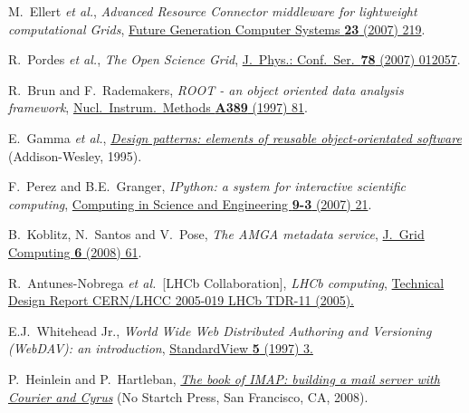 \documentclass{elsart}
\def\etal {\textit{et al.}}
\begin{document}
\begin{thebibliography}{00}
 M.~Ellert \etal,
\textit{Advanced Resource Connector middleware for lightweight
computational Grids},
\href{http://dx.doi.org/10.1016/j.future.2006.05.008}
{Future Generation Computer Systems \textbf{23} (2007) 219}.
  

 R.~Pordes \etal,
\textit{The Open Science Grid},
\href{http://dx.doi.org/10.1088/1742-6596/78/1/012057}
{J.~Phys.: Conf.\ Ser.\ \textbf{78} (2007) 012057}.

 R.~Brun and F.~Rademakers,
\textit{ROOT - an object oriented data analysis framework},
\href{http://dx.doi.org/10.1016/S0168-9002(97)00048-X}
{Nucl.\ Instrum.\ Methods \textbf{A389} (1997) 81}.

  E.~Gamma \etal,
  \href{http://www.pearsonhighered.com/educator/academic/product/0,,0201633612,00%2Ben-USS_01DBC.html}
{\textit{Design patterns: elements of reusable object-orientated software}}
(Addison-Wesley, 1995).

 F.~Perez and B.E.~Granger,
\textit{IPython: a system for interactive scientific computing},
\href{http://dx.doi.org/10.1109/MCSE.2007.53}
{Computing in Science and Engineering \textbf{9-3} (2007) 21}.

 B.~Koblitz, N.~Santos and V.~Pose,
\textit{The AMGA metadata service},
\href{http://dx.doi.org/10.1007/s10723-007-9084-6}
{J.~Grid Computing \textbf{6} (2008) 61}.

R.~Antunes-Nobrega \etal\ [LHCb Collaboration],
\textit{LHCb computing},
\href{http://cdsweb.cern.ch/record/835156}
{Technical Design Report CERN/LHCC 2005-019 LHCb TDR-11 (2005).}

 E.J.~Whitehead Jr.,
\textit{World Wide Web Distributed Authoring and Versioning (WebDAV):
an introduction},
\href{http://dx.doi.org/10.1145/253452.253458}
{StandardView \textbf{5} (1997) 3.}

 P.~Heinlein and P.~Hartleban,
\href{http://nostarch.com/imap.htm}
{\textit{The book of IMAP: building a mail server with Courier and Cyrus}}
(No Startch Press, San Francisco, CA, 2008).


\end{thebibliography}
\end{document}
